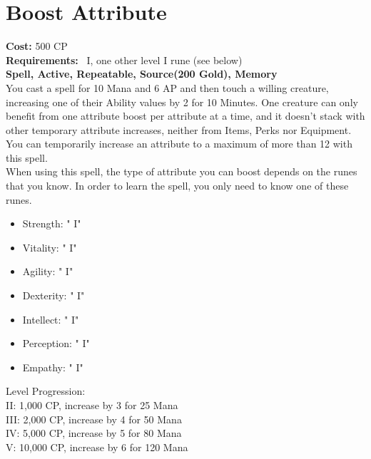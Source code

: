 \section{Boost Attribute}\label{spell:boostAttribute}
\textbf{Cost:} 500 CP\\
\textbf{Requirements:}~ I, one other level I rune (see below)\\
\textbf{Spell, Active, Repeatable, Source(200 Gold), Memory}\\
You cast a spell for 10 Mana and 6 AP and then touch a willing creature, increasing one of their Ability values by 2 for 10 Minutes.
One creature can only benefit from one attribute boost per attribute at a time, and it doesn't stack with other temporary attribute increases, neither from Items, Perks nor Equipment.
You can temporarily increase an attribute to a maximum of more than 12 with this spell.\\
When using this spell, the type of attribute you can boost depends on the runes that you know.
In order to learn the spell, you only need to know one of these runes.\\
\begin{itemize}
    \item Strength: " I"
    \item Vitality: " I"
    \item Agility: " I"
    \item Dexterity: " I"
    \item Intellect: " I"
    \item Perception: " I"
    \item Empathy: " I"
\end{itemize}
Level Progression:\\
II: 1,000 CP, increase by 3 for 25 Mana\\
III: 2,000 CP, increase by 4 for 50 Mana\\
IV: 5,000 CP, increase by 5 for 80 Mana\\
V: 10,000 CP, increase by 6 for 120 Mana\\